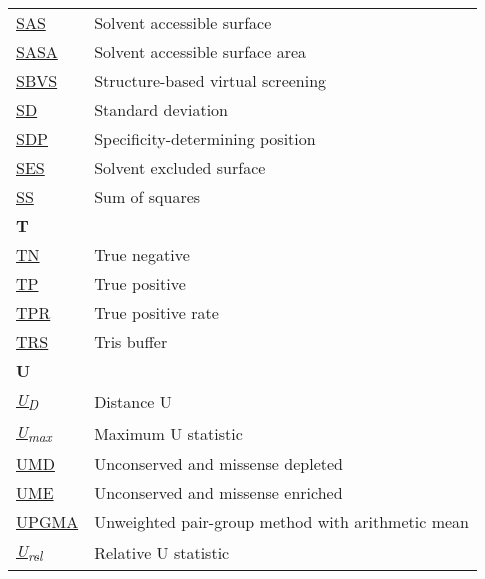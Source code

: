 \begin{longtable}[l]{@{}p{2.5cm}p{12cm}@{}}
\textmd{\href{https://en.wikipedia.org/wiki/Accessible_surface_area}{SAS}} & Solvent accessible surface \\
\textmd{\href{https://en.wikipedia.org/wiki/Accessible_surface_area}{SASA}} & Solvent accessible surface area \\
\textmd{\href{https://en.wikipedia.org/wiki/Virtual_screening\#Structure-based_methods_known_protein_ligand_docking}{SBVS}} & Structure-based virtual screening \\
\textmd{\href{https://en.wikipedia.org/wiki/Standard_deviation}{SD}} & Standard deviation \\
\textmd{\href{https://www.nature.com/articles/s42003-024-06117-5}{SDP}} & Specificity-determining position \\
\textmd{\href{https://en.wikipedia.org/wiki/Accessible_surface_area\#Relation_to_solvent-excluded_surface}{SES}} & Solvent excluded surface \\
\textmd{\href{https://en.wikipedia.org/wiki/Sum_of_squares}{SS}} & Sum of squares \\[0.3175cm]
\textbf{\large T} & \\[0.25cm]
\textmd{\href{https://en.wikipedia.org/wiki/False_positives_and_false_negatives}{TN}} & True negative \\
\textmd{\href{https://en.wikipedia.org/wiki/False_positives_and_false_negatives}{TP}} & True positive \\
\textmd{\href{https://en.wikipedia.org/wiki/TPR}{TPR}} & True positive rate \\
\textmd{\href{https://www.ebi.ac.uk/pdbe-srv/pdbechem/chemicalCompound/show/TRS}{TRS}} & Tris buffer \\[0.3175cm]
\textbf{\large U} & \\[0.25cm]
\textmd{\href{https://www.nature.com/articles/s42003-024-05970-8}{\textit{U\textsubscript{D}}}} & Distance U \\
\textmd{\href{https://www.nature.com/articles/s42003-024-05970-8}{\textit{U\textsubscript{max}}}} & Maximum U statistic \\
\textmd{\href{https://www.nature.com/articles/s42003-024-06117-5}{UMD}} & Unconserved and missense depleted \\
\textmd{\href{https://www.nature.com/articles/s42003-024-06117-5}{UME}} & Unconserved and missense enriched \\
\textmd{\href{https://en.wikipedia.org/wiki/UPGMA}{UPGMA}} & Unweighted pair-group method with arithmetic mean \\
\textmd{\href{https://www.nature.com/articles/s42003-024-05970-8}{\textit{U\textsubscript{rel}}}} & Relative U statistic \\[0.3175cm]

\end{longtable}
